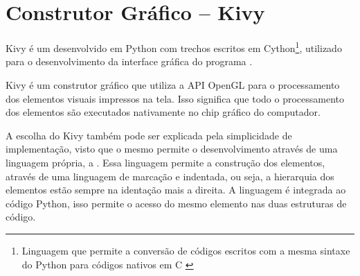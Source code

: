     
    \section{Construtor Gráfico -- Kivy}

        Kivy é um  desenvolvido em Python com trechos escritos em Cython\footnote{Linguagem que permite  a conversão de códigos escritos com a mesma sintaxe do Python para códigos nativos em C \cite{cython}}, utilizado para o desenvolvimento da interface gráfica do programa \cite{kivy}.
        
        Kivy é um construtor gráfico que utiliza a API OpenGL \cite{opengl} para o processamento dos elementos visuais impressos na tela. Isso significa que todo o processamento dos elementos são executados nativamente no chip gráfico do computador.
        
        A escolha do Kivy também pode ser explicada pela simplicidade de implementação, visto que o mesmo permite o desenvolvimento através de uma linguagem própria, a  \cite{kvlang}. Essa linguagem permite a construção dos elementos, através de uma linguagem de marcação e indentada, ou seja, a hierarquia dos elementos estão sempre na identação mais a direita. A linguagem  é integrada ao código Python, isso permite o acesso do mesmo elemento nas duas estruturas de código.
